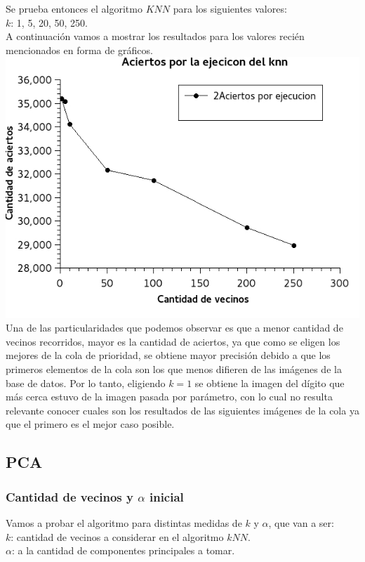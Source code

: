 Se prueba entonces el algoritmo $KNN$ para los siguientes valores:\\
$k$: 1, 5, 20, 50, 250.\\

A continuación vamos a mostrar los resultados para los valores reci\'en mencionados en forma de gráficos.
\\

\includegraphics[scale=0.75]{ejecucionesknn.jpg}\\

Una de las particularidades que podemos observar es que a menor cantidad de vecinos recorridos, mayor es la cantidad de aciertos, ya que como se eligen los mejores de la cola de prioridad, se obtiene mayor precisión debido a que los primeros elementos de la cola son los que menos difieren de las imágenes de la base de datos.
Por lo tanto, eligiendo $k = 1$ se obtiene la imagen del dígito que más cerca estuvo de la imagen pasada por parámetro, con lo cual no resulta relevante conocer cuales son los resultados de las siguientes imágenes de la cola ya que el primero es el mejor caso posible.

\subsection{PCA}
\subsubsection{Cantidad de vecinos y $\alpha$ inicial}
Vamos a probar el algoritmo para distintas medidas de $k$ y $\alpha$, que van a ser:\\
$k$: cantidad de vecinos a considerar en el algoritmo $kNN$.\\
$\alpha$: a la cantidad de componentes principales a tomar.

